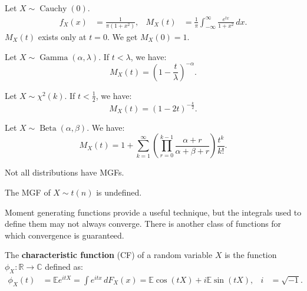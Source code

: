 \documentclass{huhtakm-template-book-v2}
\newcommand{\expect}{\mathbb{E}}
\DeclareMathOperator{\Cauchy}{Cauchy}
\DeclareMathOperator{\Gam}{Gamma}
\DeclareMathOperator{\Beta}{Beta}
\begin{document}
    \begin{eg}
        Let $X \sim \Cauchy(0)$.
        \begin{align*}
            f_{X}(x) &= \frac{1}{\pi(1+x^{2})}, & M_{X}(t) &= \frac{1}{\pi}\int_{-\infty}^{\infty}\frac{e^{tx}}{1+x^{2}}\,dx.
        \end{align*}
        $M_{X}(t)$ exists only at $t = 0$. We get $M_{X}(0) = 1$.
    \end{eg}
    \begin{eg}
        Let $X \sim \Gam(\alpha,\lambda)$. If $t < \lambda$, we have:
        \begin{equation*}
            M_{X}(t) = \left(1-\frac{t}{\lambda}\right)^{-\alpha}.
        \end{equation*}
    \end{eg}
    \begin{eg}
        Let $X \sim \chi^{2}(k)$. If $t < \frac{1}{2}$, we have:
        \begin{equation*}
            M_{X}(t) = (1-2t)^{-\frac{k}{2}}.
        \end{equation*}
    \end{eg}
    \begin{eg}
        Let $X \sim \Beta(\alpha,\beta)$. We have:
        \begin{equation*}
            M_{X}(t) = 1+\sum_{k = 1}^{\infty}\left(\prod_{r = 0}^{k-1}\frac{\alpha+r}{\alpha+\beta+r}\right)\frac{t^{k}}{k!}.
        \end{equation*}
    \end{eg}
    \begin{rem}
        Not all distributions have MGFs.
    \end{rem}
    \begin{eg}
        The MGF of $X \sim t(n)$ is undefined.
    \end{eg}
    Moment generating functions provide a useful technique, but the integrals used to define them may not always converge. There is another class of functions for which convergence is guaranteed.
    \begin{defn}
        The \textbf{characteristic function} (CF) of a random variable $X$ is the function $\phi_{X}:\mathbb{R} \to \mathbb{C}$ defined as:
        \begin{align*}
            \phi_{X}(t) &= \expect{e^{itX}} = \int e^{itx}\,dF_{X}(x) = \expect{\cos(tX)}+i\expect{\sin(tX)}, & i &= \sqrt{-1}.
        \end{align*}
    \end{defn}
\end{document}
